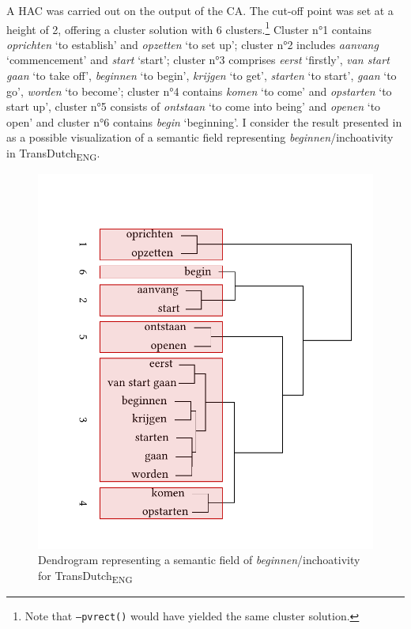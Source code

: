 A HAC was carried out on the output of the CA. The cut-off point was set at a height of 2, offering a cluster solution with 6 clusters.\footnote{Note that \texttt{–pvrect()} would have yielded the same cluster solution.} Cluster n°1 contains \textit{oprichten} `to establish' and \textit{opzetten} `to set up'; cluster n°2 includes \textit{aanvang} `commencement' and \textit{start} `start'; cluster n°3 comprises \textit{eerst} `firstly', \textit{van start gaan} `to take off', \textit{beginnen} `to begin', \textit{krijgen} `to get', \textit{starten} `to start', \textit{gaan} `to go', \textit{worden} `to become'; cluster n°4 contains \textit{komen} `to come' and \textit{opstarten} `to start up', cluster n°5 consists of \textit{ontstaan} `to come into being' and \textit{openen} `to open' and cluster n°6 contains \textit{begin} `beginning'. I consider the result presented in  as a possible visualization of a semantic field representing \textit{beginnen}/inchoativity in TransDutch\textsubscript{ENG}.

\begin{figure}
\includegraphics[width=\textwidth]{figures/tree65.pdf}
\caption{\label{fig:4:64}Dendrogram representing a semantic field of \textit{beginnen}/inchoativity for TransDutch\textsubscript{ENG}}
\end{figure}

